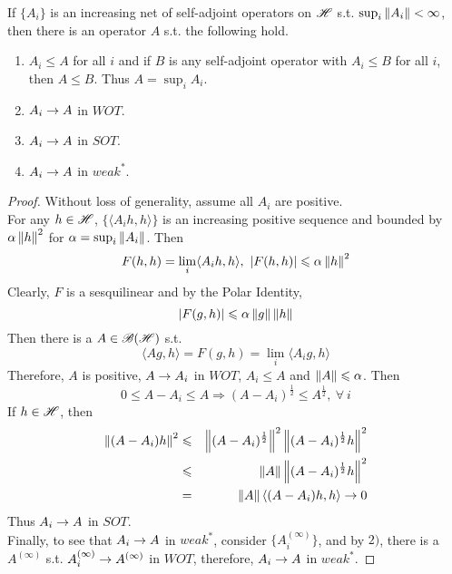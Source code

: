 \begin{prop}
	If $\{A_i\}$ is an increasing net of self-adjoint operators on $\mathscr{H}$ s.t. $\sup_i{\left\lVert A_i\right\lVert} < \infty$, then there is an operator $A$ s.t. the following hold.
	\begin{enumerate}[label = \arabic*)]
		\item $A_i \leqslant A$ for all $i$ and if $B$ is any self-adjoint operator with $A_i \leqslant B$ for all $i$, then $A \leqslant B$. Thus $A = \sup_i A_i$.
		\item $A_i \rightarrow A$ in $WOT$.
		\item $A_i \rightarrow A$ in $SOT$.
		\item $A_i \rightarrow A$ in $weak^{*}$.
	\end{enumerate}
\end{prop}
\begin{proof}
	Without loss of generality, assume all $A_i$ are positive.\\
	For any $h \in \mathscr{H}$, $\{\langle A_i h, h \rangle\}$ is an increasing positive sequence and bounded by $\alpha \left\lVert h\right\lVert^2$ for $\alpha = \sup_i{\left\lVert A_i\right\lVert}$. Then
	\begin{equation*}
		F(h,h) = \lim_i \langle A_i h, h \rangle,~ \left\lvert F(h,h)\right\lvert \leqslant \alpha \left\lVert h\right\lVert^2
	\end{equation*}
	Clearly, $F$ is a sesquilinear and by the Polar Identity, 
	\begin{equation*}
		\left\lvert F(g,h)\right\lvert \leqslant \alpha \left\lVert g\right\lVert \left\lVert h\right\lVert
	\end{equation*}
	Then there is a $A \in \mathscr{B(H)}$ s.t. 
	\begin{equation*}
		\langle Ag,h \rangle = F(g,h) = \lim_i \langle A_i g, h \rangle
	\end{equation*}
	Therefore, $A$ is positive, $A \rightarrow A_i$ in $WOT$, $A_i \leqslant A$ and $\left\lVert A\right\lVert \leqslant \alpha$. Then
	\begin{equation*}
		0 \leqslant A - A_i \leqslant A \Rightarrow (A-A_i)^{\frac{1}{2}} \leqslant A^{\frac{1}{2}},~ \forall~ i
	\end{equation*}
	If $h \in \mathscr{H}$, then
	\begin{eqnarray*}
		\left\lVert(A-A_i)h\right\lVert^2 &\leqslant& \left\lVert(A-A_i)^{\frac{1}{2}}\right\lVert^2 \left\lVert(A-A_i)^{\frac{1}{2}}h\right\lVert^2 \\
		&\leqslant& \left\lVert A\right\lVert \left\lVert(A-A_i)^{\frac{1}{2}}h\right\lVert^2 \\
		&=& \left\lVert A\right\lVert \langle (A-A_i)h,h  \rangle \rightarrow 0
	\end{eqnarray*}
	Thus $A_i \rightarrow A$ in $SOT$. \\
	Finally, to see that $A_i \rightarrow A$ in $weak^{*}$, consider $\{A_i^{(\infty)}\}$, and by $2)$, there is a $A^{(\infty)}$ s.t. $A_i^{(\infty)} \rightarrow A^{(\infty)}$ in $WOT$, therefore, $A_i \rightarrow A$ in $weak^{*}$.
\end{proof}

